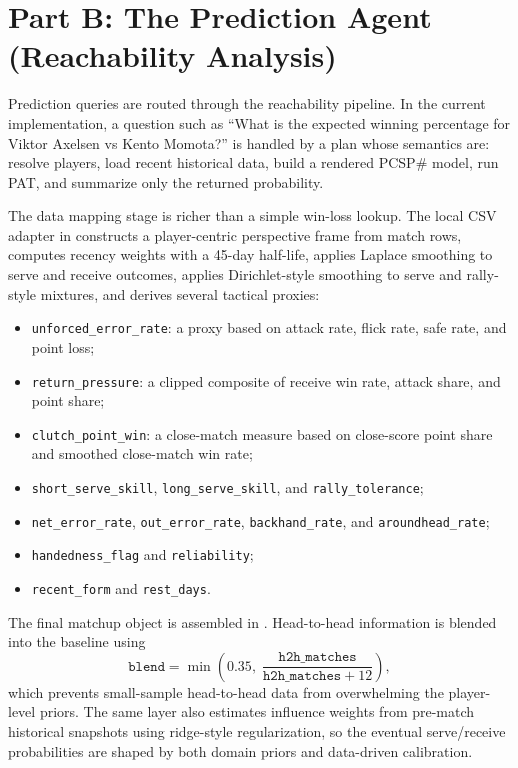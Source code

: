 \documentclass{article}
\begin{document}
\section{Part B: The Prediction Agent (Reachability Analysis)}
Prediction queries are routed through the reachability pipeline. In the current implementation, a question such as ``What is the expected winning percentage for Viktor Axelsen vs Kento Momota?'' is handled by a plan whose semantics are: resolve players, load recent historical data, build a rendered PCSP\# model, run PAT, and summarize only the returned probability.

The data mapping stage is richer than a simple win-loss lookup. The local CSV adapter in  constructs a player-centric perspective frame from match rows, computes recency weights with a 45-day half-life, applies Laplace smoothing to serve and receive outcomes, applies Dirichlet-style smoothing to serve and rally-style mixtures, and derives several tactical proxies:
\begin{itemize}
\item \texttt{unforced\_error\_rate}: a proxy based on attack rate, flick rate, safe rate, and point loss;
\item \texttt{return\_pressure}: a clipped composite of receive win rate, attack share, and point share;
\item \texttt{clutch\_point\_win}: a close-match measure based on close-score point share and smoothed close-match win rate;
\item \texttt{short\_serve\_skill}, \texttt{long\_serve\_skill}, and \texttt{rally\_tolerance};
\item \texttt{net\_error\_rate}, \texttt{out\_error\_rate}, \texttt{backhand\_rate}, and \texttt{aroundhead\_rate};
\item \texttt{handedness\_flag} and \texttt{reliability};
\item \texttt{recent\_form} and \texttt{rest\_days}.
\end{itemize}

The final matchup object is assembled in . Head-to-head information is blended into the baseline using
\[
\texttt{blend} = \min\!\left(0.35,\; \frac{\texttt{h2h\_matches}}{\texttt{h2h\_matches}+12}\right),
\]
which prevents small-sample head-to-head data from overwhelming the player-level priors. The same layer also estimates influence weights from pre-match historical snapshots using ridge-style regularization, so the eventual serve/receive probabilities are shaped by both domain priors and data-driven calibration.
\end{document}

